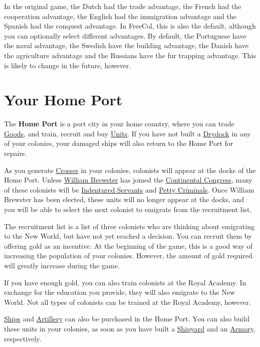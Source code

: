 \documentclass[12pt]{book}
\begin{document}
In the original game, the Dutch had the trade advantage, the French
had the cooperation advantage, the English had the immigration
advantage and the Spanish had the conquest advantage. In FreeCol, this
is also the default, although you can optionally select different
advantages. By default, the Portuguese have the naval advantage, the
Swedish have the building advantage, the Danish have the agriculture
advantage and the Russians have the fur trapping advantage. This is
likely to change in the future, however.


\hypertarget{Home Port}{\section{Your Home Port}}

The \textbf{Home Port} is a port city in your home country, where you
can trade \hyperlink{Goods}{Goods}, and train, recruit and buy
\hyperlink{Units}{Units}. If you have not built a
\hyperlink{Drydock}{Drydock} in any of your colonies, your damaged
ships will also return to the Home Port for repairs.

As you generate \hyperlink{Crosses}{Crosses} in your colonies,
colonists will appear at the docks of the Home Port. Unless
\hyperlink{William Brewster}{William Brewster} has joined the
\hyperlink{Continental Congress}{Continental Congress}, many of these
colonists will be \hyperlink{Indentured Servant}{Indentured Servants}
and \hyperlink{Petty Criminal}{Petty Criminals}. Once William
Brewster has been elected, these units will no longer appear at the
docks, and you will be able to select the next colonist to emigrate
from the recruitment list.

The recruitment list is a list of three colonists who are thinking
about emigrating to the New World, but have not yet reached a
decision. You can recruit them by offering gold as an incentive. At
the beginning of the game, this is a good way of increasing the
population of your colonies. However, the amount of gold required will
greatly increase during the game.

If you have enough gold, you can also train colonists at the
\hypertarget{Royal Academy}{Royal Academy}. In exchange for the
education you provide, they will also emigrate to the New World. Not
all types of colonists can be trained at the Royal Academy, however.

\hyperlink{Naval Units}{Ships} and \hyperlink{Artillery}{Artillery}
can also be purchased in the Home Port. You can also build these units
in your colonies, as soon as you have built a
\hyperlink{Shipyard}{Shipyard} and an \hyperlink{Armory}{Armory},
respectively.
\end{document}
